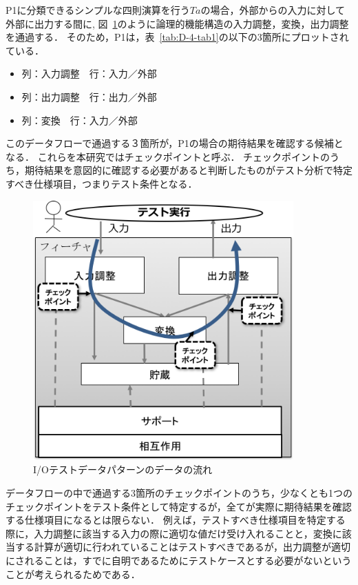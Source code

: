 P1に分類できるシンプルな四則演算を行う$Ta$の場合，外部からの入力に対して外部に出力する間に,
図~\ref{fig:D-4-Fig7}のように論理的機能構造の入力調整，変換，出力調整を通過する．
そのため，P1は，表~\ref{tab:D-4-tab1}の以下の3箇所にプロットされている．
\begin{itemize}
  \item 列：入力調整　行：入力／外部
  \item 列：出力調整　行：出力／外部
  \item 列：変換　行：入力／外部
\end{itemize}

このデータフローで通過する３箇所が，P1の場合の期待結果を確認する候補となる．
これらを本研究ではチェックポイントと呼ぶ．
チェックポイントのうち，期待結果を意図的に確認する必要があると判断したものがテスト分析で特定すべき仕様項目，つまりテスト条件となる．

 \begin{figure}[htbp]
 \begin{center}
 \includegraphics[width=10cm]{./image/D-4-Fig7.png}
 \caption{I/Oテストデータパターンのデータの流れ}
 \label{fig:D-4-Fig7}
 \end{center}
 \end{figure}

データフローの中で通過する3箇所のチェックポイントのうち，少なくとも1つのチェックポイントをテスト条件として特定するが，全てが実際に期待結果を確認する仕様項目になるとは限らない．
例えば，テストすべき仕様項目を特定する際に，入力調整に該当する入力の際に適切な値だけ受け入れることと，変換に該当する計算が適切に行われていることはテストすべきであるが，出力調整が適切にされることは，すでに自明であるためにテストケースとする必要がないということが考えられるためである．

